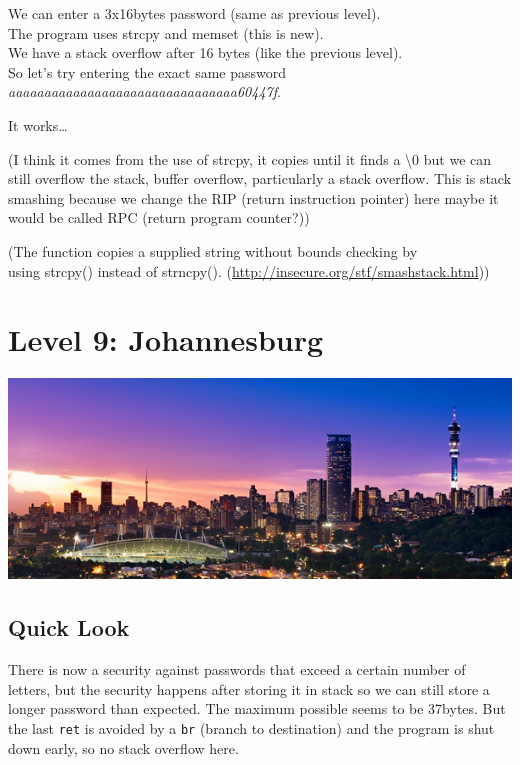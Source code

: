 \documentclass[a4paper,11pt]{article}
\begin{document}
We can enter a 3x16bytes password (same as previous level).\\The program
uses strcpy and memset (this is new).\\We have a stack overflow after 16
bytes (like the previous level).\\So let's try entering the exact same
password \emph{aaaaaaaaaaaaaaaaaaaaaaaaaaaaaaaa60447f}.

It works\ldots{}

(I think it comes from the use of strcpy, it copies until it finds a
\textbackslash{}0 but we can still overflow the stack, buffer overflow,
particularly a stack overflow. This is stack smashing because we change
the RIP (return instruction pointer) here maybe it would be called RPC
(return program counter?))

(The function copies a supplied string without bounds checking by\\using
strcpy() instead of strncpy().
(\url{http://insecure.org/stf/smashstack.html}))

\section{Level 9: Johannesburg}\label{level-9-johannesburg}

\includegraphics{img/9_2.PNG}

\subsection{Quick Look}\label{quick-look}

There is now a security against passwords that exceed a certain number
of letters, but the security happens after storing it in stack so we can
still store a longer password than expected. The maximum possible seems
to be 37bytes. But the last \texttt{ret} is avoided by a \texttt{br}
(branch to destination) and the program is shut down early, so no stack
overflow here.
\end{document}
